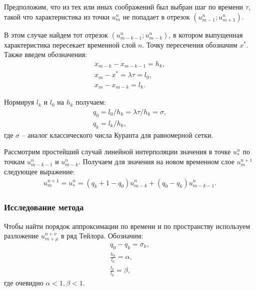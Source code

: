 Предположим, что из тех или иных соображений был выбран шаг по времени $\tau$, такой что характеристика из точки $u_m^n$ не попадает в отрезок $(u_{m-1}^n; u_{m+1}^n)$.

В этом случае найдем тот отрезок $(u_{m-k-1}^n; u_{m-k}^n)$, в котором выпущенная характеристика пересекает временной слой $n$. Точку пересечения обозначим $x^*$. Также введем обозначения:
\begin{eqnarray}
x_{m-k} - x_{m-k-1} = h_k,\nonumber\\
x_m - x^* = \lambda \tau = l_0,\nonumber\\
x_m - x_{m-k} = l_k.
\end{eqnarray}

Нормируя $l_k$ и $l_0$ на $h_k$ получаем:
\begin{eqnarray}
q_0 = l_0 / h_k = \lambda \tau / h_k = \sigma,\nonumber\\
q_k = l_k / h_k,
\end{eqnarray}
где $\sigma$ -- аналог классического числа Куранта для равномерной сетки.

Рассмотрим простейший случай линейной интерполяции значения в точке $u_*^n$ по точкам  $u_{m-k-1}^n$ и $u_{m-k}^n$. Получаем для значения на новом временном слое $u_m^{n+1}$ следующее выражение:
\begin{eqnarray}
\label{newmethod_1d_scheme}
u_m^{n+1} = u_*^n = (q_k + 1 - q_0) u_{m-k}^n + (q_0 - q_k) u_{m-k-1}^n.
\end{eqnarray}


\subsubsection{Исследование метода}

Чтобы найти порядок аппроксимации по времени и по пространству используем разложение $u_{m+\mu}^{n+\nu}$ в ряд Тейлора. Обозначим:
\begin{eqnarray}
q_0 - q_k = \sigma_k,\nonumber\\
\frac{h_k}{l_0} = \alpha,\nonumber\\
\frac{l_k}{l_0} = \beta,
\end{eqnarray}
где очевидно $\alpha < 1, \beta < 1$.

